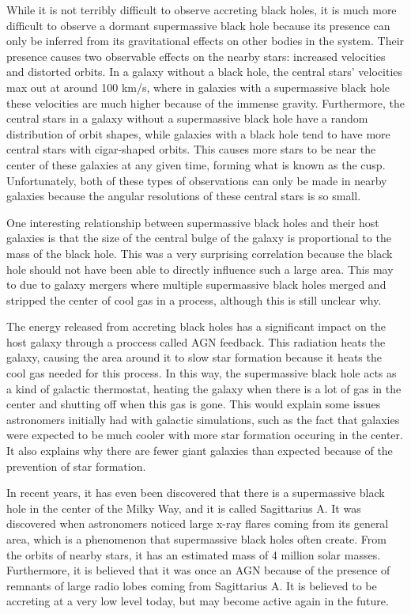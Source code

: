 \documentclass[12pt]{article}
\begin{document}
While it is not terribly difficult to observe accreting black holes, it is much
more difficult to observe a dormant supermassive black hole because its presence
can only be inferred from its gravitational effects on other bodies in the
system.  Their presence causes two observable effects on the nearby stars:
increased velocities and distorted orbits.  In a galaxy without a black hole,
the central stars' velocities max out at around 100 km/s, where in galaxies with
a supermassive black hole these velocities are much higher because of the
immense gravity.  Furthermore, the central stars in a galaxy without a
supermassive black hole have a random distribution of orbit shapes, while
galaxies with a black hole tend to have more central stars with cigar-shaped
orbits.  This causes more stars to be near the center of these galaxies at any
given time, forming what is known as the cusp.  Unfortunately, both of these
types of observations can only be made in nearby galaxies because the angular
resolutions of these central stars is so small.

One interesting relationship between supermassive black holes and their host
galaxies is that the size of the central bulge of the galaxy is proportional to
the mass of the black hole.  This was a very surprising correlation because the
black hole should not have been able to directly influence such a large area.
This may to due to galaxy mergers where multiple supermassive black holes merged
and stripped the center of cool gas in a process, although this is still unclear
why.

The energy released from accreting black holes has a significant impact on the
host galaxy through a proccess called AGN feedback.  This radiation heats the
galaxy, causing the area around it to slow star formation because it heats the
cool gas needed for this process.  In this way, the supermassive black hole acts
as a kind of galactic thermostat, heating the galaxy when there is a lot of gas
in the center and shutting off when this gas is gone.  This would explain some
issues astronomers initially had with galactic simulations, such as the fact
that galaxies were expected to be much cooler with more star formation occuring
in the center.  It also explains why there are fewer giant galaxies than
expected because of the prevention of star formation.

In recent years, it has even been discovered that there is a supermassive black
hole in the center of the Milky Way, and it is called Sagittarius A.  It was
discovered when astronomers noticed large x-ray flares coming from its general
area, which is a phenomenon that supermassive black holes often create.  From
the orbits of nearby stars, it has an estimated mass of 4 million solar masses.
Furthermore, it is believed that it was once an AGN because of the presence of
remnants of large radio lobes coming from Sagittarius A.  It is believed to be
accreting at a very low level today, but may become active again in the future.
\end{document}
